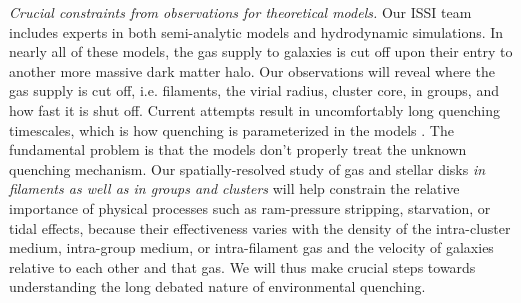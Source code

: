 \documentclass[11pt]{article}
\begin{document}
\textit{Crucial constraints from observations for theoretical models.} Our
ISSI team includes experts in both semi-analytic models and hydrodynamic simulations.  In nearly all of these
models, the gas supply to galaxies is cut off upon their entry to
another more massive dark matter halo.
Our observations will reveal where the gas supply is cut off, i.e. filaments, the virial radius, cluster core, in groups, and how fast it is shut off.  Current
attempts result in uncomfortably
long quenching timescales, which is how quenching is parameterized in the models \citep{McGee11,DeLucia12a}. The fundamental
problem is that the models don't properly treat the unknown quenching mechanism.
Our spatially-resolved study of gas and stellar disks {\em in filaments as well as in groups and clusters} will help constrain the relative importance of physical processes such as ram-pressure stripping, starvation, or tidal effects, because their effectiveness varies with
the density of the intra-cluster medium, intra-group medium, or intra-filament gas and the velocity of galaxies relative to each other and that gas. 
We will thus make crucial steps towards understanding the long debated nature of environmental quenching.

\end{document}
